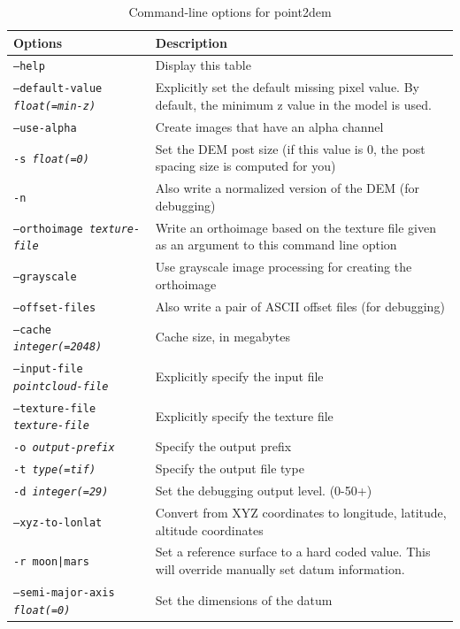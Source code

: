\begin{longtable}{|l|p{10cm}|}
\caption{Command-line options for point2dem}
\label{tbl:point2dem}
\endfirsthead
\endhead
\endfoot
\endlastfoot
\hline
Options & Description \\ \hline \hline
\texttt{--help} & Display this table \\ \hline
\texttt{--default-value \textit{float(=min-z)}} & Explicitly set the default missing pixel value. By default, the minimum z value in the model is used. \\ \hline
\texttt{--use-alpha} & Create images that have an alpha channel \\ \hline
\texttt{-s \textit{float(=0)}} & Set the \ac{DEM} post size (if this value is 0, the post spacing size is computed for you) \\ \hline
\texttt{-n} & Also write a normalized version of the \ac{DEM} (for debugging) \\ \hline
\texttt{--orthoimage \textit{texture-file}} & Write an orthoimage based on the texture file given as an argument to this command line option \\ \hline
\texttt{--grayscale} & Use grayscale image processing for creating the orthoimage \\ \hline
\texttt{--offset-files} & Also write a pair of ASCII offset files (for debugging) \\ \hline
\texttt{--cache \textit{integer(=2048)}} & Cache size, in megabytes \\ \hline
\texttt{--input-file \textit{pointcloud-file}} & Explicitly specify the input file \\ \hline
\texttt{--texture-file \textit{texture-file}} & Explicitly specify the texture file \\ \hline
\texttt{-o \textit{output-prefix}} & Specify the output prefix \\ \hline
\texttt{-t \textit{type(=tif)}} & Specify the output file type \\ \hline
\texttt{-d \textit{integer(=29)}} & Set the debugging output level. (0-50+) \\ \hline
\texttt{--xyz-to-lonlat} & Convert from XYZ coordinates to longitude, latitude, altitude coordinates \\ \hline
\texttt{-r moon|mars} & Set a reference surface to a hard coded value. This will override manually set datum information. \\ \hline
\texttt{--semi-major-axis \textit{float(=0)}} & Set the dimensions of the datum \\ \hline

\end{longtable}
